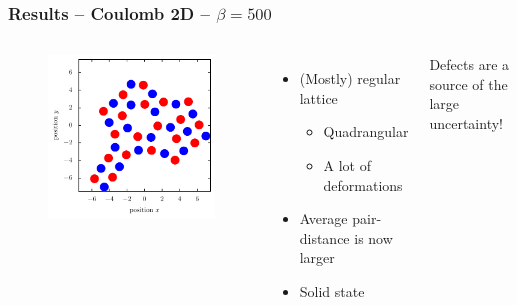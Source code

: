 \documentclass[mathserif,serif]{beamer}
\begin{document}
\begin{frame}
	\frametitle{Results -- Coulomb 2D -- $\beta=500$}
	\centering
	\begin{columns}	
	\begin{figure}
	\includegraphics[width=\textwidth]{../report/figures/Kristall_4_beta_500.pdf}
	\end{figure}
	\begin{itemize}
	\item (Mostly) regular lattice
	\begin{itemize}
		\item Quadrangular
		\item A lot of deformations
	\end{itemize}
	\item Average pair-distance is now larger
	\item Solid state
	\end{itemize}
	Defects are a source of the large uncertainty!
\end{columns}
\end{frame}
\end{document}
